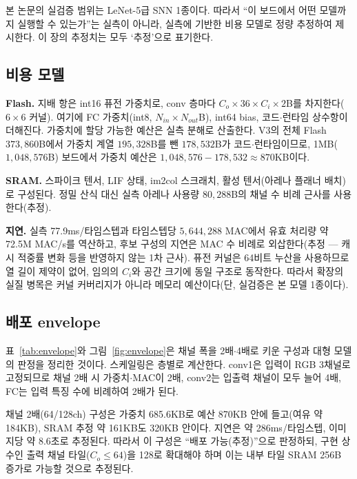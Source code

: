 \label{sec:envelope}

본 논문의 실검증 범위는 LeNet-5급 SNN 1종이다. 따라서 ``이 보드에서
어떤 모델까지 실행할 수 있는가''는 실측이 아니라, 실측에 기반한
비용 모델로 정량 추정하여 제시한다. 이 장의 추정치는 모두 `추정'으로
표기한다.

\subsection{비용 모델}

\textbf{Flash.} 지배 항은 int16 퓨전 가중치로, conv 층마다
$C_o \times 36 \times C_i \times 2$B를 차지한다($6\times6$ 커널).
여기에 FC 가중치(int8, $N_{in}\times N_{out}$B), int64 bias,
코드$\cdot$런타임 상수항이 더해진다. 가중치에 할당 가능한 예산은 실측
분해로 산출한다. V3의 전체 Flash $373{,}860$B에서 가중치 계열
$195{,}328$B를 뺀 $178{,}532$B가 코드$\cdot$런타임이므로,
1MB($1{,}048{,}576$B) 보드에서 가중치 예산은
$1{,}048{,}576-178{,}532\approx870$KB이다.

\textbf{SRAM.} 스파이크 텐서, LIF 상태, im2col 스크래치, 활성
텐서(아레나 플래너 배치)로 구성된다. 정밀 산식 대신 실측 아레나
사용량 $80{,}288$B의 채널 수 비례 근사를 사용한다(추정).

\textbf{지연.} 실측 77.9ms/타임스텝과 타임스텝당 $5{,}644{,}288$
MAC에서 유효 처리량 약 72.5M MAC/s를 역산하고, 후보 구성의 지연은 MAC
수 비례로 외삽한다(추정 --- 캐시 적중률 변화 등을 반영하지 않는 1차
근사). 퓨전 커널은 64비트 누산을 사용하므로 열 길이 제약이 없어, 임의의
$C_i$와 공간 크기에 동일 구조로 동작한다. 따라서 확장의 실질 병목은
커널 커버리지가 아니라 메모리 예산이다(단, 실검증은 본 모델 1종이다).

\subsection{배포 envelope}

표~\ref{tab:envelope}와 그림~\ref{fig:envelope}은 채널 폭을
2배$\cdot$4배로 키운 구성과 대형 모델의 판정을 정리한 것이다.
스케일링은 층별로 계산한다. conv1은 입력이 RGB 3채널로 고정되므로
채널 2배 시 가중치$\cdot$MAC이 2배, conv2는 입출력 채널이 모두 늘어
4배, FC는 입력 특징 수에 비례하여 2배가 된다.

채널 2배(64/128ch) 구성은 가중치 685.6KB로 예산 870KB 안에
들고(여유 약 184KB), SRAM 추정 약 161KB도 320KB 안이다. 지연은 약
286ms/타임스텝, 이미지당 약 8.6초로 추정된다. 따라서 이 구성은
``배포 가능(추정)''으로 판정하되, 구현 상수인 출력 채널
타일($C_o\le64$)을 128로 확대해야 하며 이는 내부 타일 SRAM 256B
증가로 가능할 것으로 추정된다.

